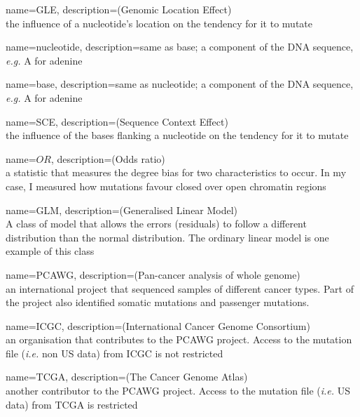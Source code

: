 \makeglossaries
{}
{
        name=GLE,
        description={(Genomic Location Effect) \\ the influence of a nucleotide's location on the tendency for it to mutate}
}

{
        name=nucleotide,
        description={same as base; a component of the DNA sequence, \textit{e.g.} A for adenine}
}

{
        name=base,
        description={same as nucleotide; a component of the DNA sequence,  \textit{e.g.} A for adenine}
}

{
        name=SCE,
        description={(Sequence Context Effect) \\ the influence of the bases flanking a nucleotide on the tendency for it to mutate}
}

{
        name=$OR$,
        description={(Odds ratio) \\ a statistic that measures the degree bias for two characteristics to occur. In my case, I measured how mutations favour closed over open chromatin regions}
}

{
        name=GLM,
        description={(Generalised Linear Model) \\ A class of model that allows the errors (residuals) to follow a different distribution than the normal distribution. The ordinary linear model is one example of this class}
}

{
        name=PCAWG,
        description={(Pan-cancer analysis of whole genome) \\ an international project that sequenced samples of different cancer types. Part of the project also identified somatic mutations and passenger mutations.}
}

{
        name=ICGC,
        description={(International Cancer Genome Consortium) \\ an organisation that contributes to the PCAWG project. Access to the mutation file (\textit{i.e.} non US data) from ICGC is not restricted}
}

{
        name=TCGA,
        description={(The Cancer Genome Atlas) \\ another contributor to the PCAWG project. Access to the mutation file (\textit{i.e.} US data) from TCGA is restricted}
}

